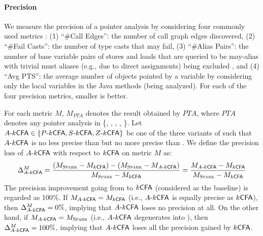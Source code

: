 \paragraph*{Precision}
\label{subsec:precision}

We measure the precision of a pointer analysis by considering four commonly used metrics \cite{smaragdakis2011pick, feng2015bottom, tan2017efficient, lu2019precision, li2018precision, He2021Turner}:
(1) ``\#Call Edges'': the number of call graph edges discovered,  
(2) ``\#Fail Casts'': the number of type casts that may fail, 
(3) ``\#Alias Pairs'': the number of base variable pairs of stores and loads  that are queried to be may-alias with trivial must aliases (e.g., due to  direct assignments) being excluded \cite{feng2015bottom},
and (4) ``Avg PTS'': the average number of objects pointed by a variable  by considering only the local variables in the Java methods (being analyzed).
For each of the four precision metrics, smaller is better.

For each  metric $M$, $M_{PTA}$ denotes the result obtained by $PTA$, where $PTA$ denotes any pointer analysis in \{\spark, , , , \}. Let $\textsf{$A$-$k$CFA}\in \{\textsf{$P$-$k$CFA}, \textsf{$S$-$k$CFA}, \textsf{$Z$-$k$CFA}\}$ be one of the three
variants of 
such that $\textsf{$A$-$k$CFA}$ is no less precise than \spark but
no more precise than . We define the precision loss of $\textsf{$A$-$k$CFA}$ with respect to $\textsf{$k$CFA}$ on metric $M$ as:
\begin{equation}
\label{eq:precisionloss}
    \Delta_{\textsf{$A$-$k$CFA}}^{M} = \frac{(M_{\textsc{Spark}} - M_{\textsf{$k$CFA}}) - (M_{\textsc{Spark}} - M_{\textsf{$A$-$k$CFA}})}{M_{\textsc{Spark}} - M_{\textsf{$k$CFA}}} = \frac{M_{\textsf{$A$-$k$CFA}} - M_{\textsf{$k$CFA}}}{M_{\textsc{Spark}} - M_{\textsf{$k$CFA}}}
\end{equation}
The precision improvement going from \spark to $\textsf{$k$CFA}$ (considered as the
baseline) is regarded as 100\%. If $M_{\textsf{$A$-$k$CFA}} = M_{\textsf{$k$CFA}}$ (i.e., $\textsf{$A$-$k$CFA}$ is equally precise as $\textsf{$k$CFA}$), then
$\Delta_{\textsf{$A$-$k$CFA}}^{M}=0\%$, implying that
$\textsf{$A$-$k$CFA}$ loses no precision at all. On the other hand, if $M_{\textsf{$A$-$k$CFA}} = M_{\textsc{Spark}}$ (i.e.,
$\textsf{$A$-$k$CFA}$ degenerates into \spark), then
$\Delta_{\textsf{$A$-$k$CFA}}^{M}=100\%$, implying that
$\textsf{$A$-$k$CFA}$ loses all the precision gained by $\textsf{$k$CFA}$. 

